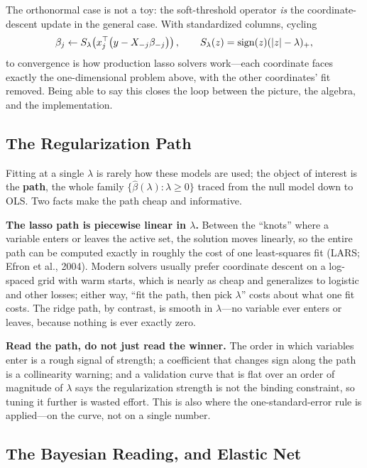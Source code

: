The orthonormal case is not a toy: the soft-threshold operator \emph{is} the coordinate-descent update in the general case. With standardized columns, cycling
\begin{equation}
\beta_j \leftarrow S_\lambda\!\left(x_j^{\top}\big(y - X_{-j}\beta_{-j}\big)\right), \qquad S_\lambda(z) = \operatorname{sign}(z)(\left|z\right|-\lambda)_+ ,
\end{equation}
to convergence is how production lasso solvers work---each coordinate faces exactly the one-dimensional problem above, with the other coordinates' fit removed. Being able to say this closes the loop between the picture, the algebra, and the implementation.

\subsection{The Regularization Path}

Fitting at a single $\lambda$ is rarely how these models are used; the object of interest is the \textbf{path}, the whole family $\{\hat\beta(\lambda) : \lambda \ge 0\}$ traced from the null model down to OLS. Two facts make the path cheap and informative.

\textbf{The lasso path is piecewise linear in $\lambda$.} Between the ``knots'' where a variable enters or leaves the active set, the solution moves linearly, so the entire path can be computed exactly in roughly the cost of one least-squares fit (LARS; Efron et al., 2004). Modern solvers usually prefer coordinate descent on a log-spaced grid with warm starts, which is nearly as cheap and generalizes to logistic and other losses; either way, ``fit the path, then pick $\lambda$'' costs about what one fit costs. The ridge path, by contrast, is smooth in $\lambda$---no variable ever enters or leaves, because nothing is ever exactly zero.

\textbf{Read the path, do not just read the winner.} The order in which variables enter is a rough signal of strength; a coefficient that changes sign along the path is a collinearity warning; and a validation curve that is flat over an order of magnitude of $\lambda$ says the regularization strength is not the binding constraint, so tuning it further is wasted effort. This is also where the one-standard-error rule is applied---on the curve, not on a single number.

\subsection{The Bayesian Reading, and Elastic Net}

